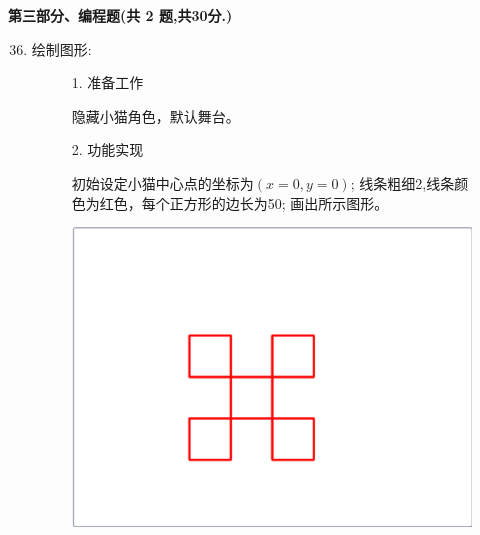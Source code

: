 \documentclass[10pt, a4paper]{article}
\begin{document}
    {\noindent \textbf{第三部分、编程题(共 2 题,共30分.)}}
    \begin{enumerate}
        \setcounter{enumi}{35}
        
        \item 绘制图形:
        \begin{figure}[htbp]
            \begin{minipage}{.6\textwidth}
                1. 准备工作
                \begin{tasks}[label = (\arabic*)]
                    \task 隐藏小猫角色，默认舞台。
                \end{tasks}
                2. 功能实现
                \begin{tasks}[label = (\arabic*)]
                    \task 初始设定小猫中心点的坐标为$(x=0,y=0)$;
                    \task 线条粗细2,线条颜色为红色，每个正方形的边长为50;
                    \task 画出所示图形。
                \end{tasks}
            \end{minipage}
            \begin{minipage}{.37\textwidth}
                \centering
                \includegraphics[width=\textwidth]{36.png}
            \end{minipage}
        \end{figure}


\end{enumerate}
\end{document}
